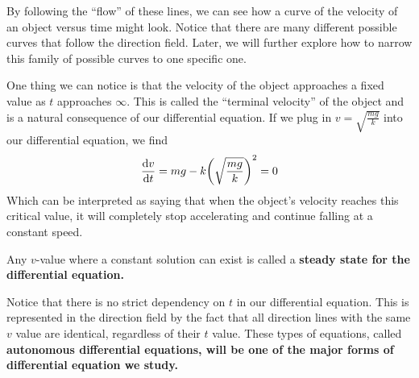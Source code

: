 \begin{example}
\begin{figure}[h!]
    \end{figure}
    By following the ``flow'' of these lines, we can see how a curve of the velocity of an object versus time might look. Notice that there are many different possible curves that follow the direction field. Later, we will further explore how to narrow this family of possible curves to one specific one. \par
    One thing we can notice is that the velocity of the object approaches a fixed value as $t$ approaches $\infty$. This is called the ``terminal velocity'' of the object and is a natural consequence of our differential equation. If we plug in $v = \sqrt{\frac{mg}{k}}$ into our differential equation, we find 
    \[ \dv{v}{t} = mg - k\pqty{\sqrt{\frac{mg}{k}}}^2 = 0 \]
    Which can be interpreted as saying that when the object's velocity reaches this critical value, it will completely stop accelerating and continue falling at a constant speed. \par
    Any $v$-value where a constant solution can exist is called a \bf{steady state} for the differential equation. \par
    Notice that there is no strict dependency on $t$ in our differential equation. This is represented in the direction field by the fact that all direction lines with the same $v$ value are identical, regardless of their $t$ value. These types of equations, called \bf{autonomous} differential equations, will be one of the major forms of differential equation we study.
\end{example}
